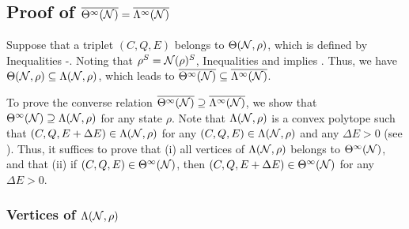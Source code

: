 \documentclass[journal]{IEEEtran}
\begin{document}
\begin{lmm}
\begin{lmm}
\subsection{Proof of $\overline{\Theta^{\infty}({\mathcal N})}=\overline{\Lambda^{\infty}({\mathcal N})}$}


Suppose that a triplet $(C,Q,E)$ belongs to $\Theta({\mathcal N},\rho)$, which is defined by Inequalities -. Noting that $\rho^{S}={\mathcal N}(\rho)^{S}$, Inequalities  and  implies .
Thus, we have $\Theta({\mathcal N},\rho)\subseteq\Lambda({\mathcal N},\rho)$, which leads to $\overline{\Theta^{\infty}({\mathcal N})}\subseteq\overline{\Lambda^{\infty}({\mathcal N})}$.

To prove the converse relation $\overline{\Theta^{\infty}({\mathcal N})}\supseteq\overline{\Lambda^{\infty}({\mathcal N})}$, we show that $\Theta^{\infty}({\mathcal N})\supseteq\Lambda({\mathcal N},\rho)$ for any state $\rho$. 
Note that $\Lambda({\mathcal N},\rho)$ is a convex polytope such that $(C,Q,E+\Delta E)\in\Lambda({\mathcal N},\rho)$ for any $(C,Q,E)\in\Lambda({\mathcal N},\rho)$ and any $\Delta E>0$ (see ).
Thus, it suffices to prove that (i) all vertices of $\Lambda({\mathcal N},\rho)$ belongs to $\Theta^{\infty}({\mathcal N})$, and that (ii) if $(C,Q,E)\in\Theta^{\infty}({\mathcal N})$, then $(C,Q,E+\Delta E)\in\Theta^{\infty}({\mathcal N})$ for any $\Delta E>0$.



\subsubsection{Vertices of $\Lambda({\mathcal N},\rho)$}



\end{lmm}
\end{lmm}
\end{document}
